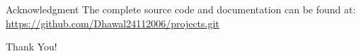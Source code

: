 \documentclass{beamer}
\begin{document}
\begin{frame}{Acknowledgment}
\centering
The complete source code and documentation can be found at:\\
\url{https://github.com/Dhawal24112006/projects.git}

\vspace{1cm}
Thank You!
\end{frame}
\end{document}
